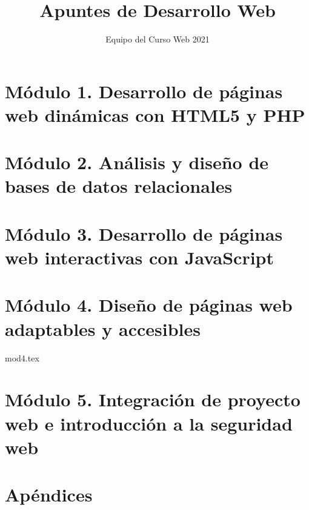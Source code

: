 \documentclass[12pt]{report}
\title{Apuntes de Desarrollo Web}
\author{Equipo del Curso Web 2021}
\begin{document}
	\maketitle
	\tableofcontents
	\chapter{Módulo 1. Desarrollo de páginas web dinámicas con HTML5 y PHP}
	\chapter{Módulo 2. Análisis y diseño de bases de datos relacionales}
	\chapter{Módulo 3. Desarrollo de páginas web interactivas con JavaScript}
	\chapter{Módulo 4. Diseño de páginas web adaptables y accesibles}
		{mod4.tex}
	\chapter{Módulo 5. Integración de proyecto web e introducción a la seguridad web}
	\appendix
	\chapter{Apéndices}
\end{document}
